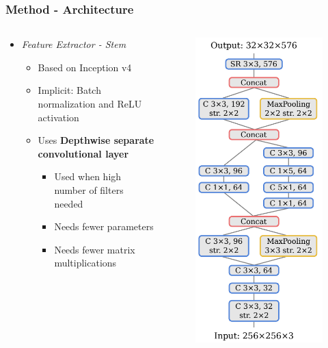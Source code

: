 \documentclass[9pt]{beamer}
\newenvironment{myframe}[1][]{%
\begin{frame}%
\frametitle{#1}
\setcounter{footnote}{0}


}{%
\end{frame}%
}
\begin{document}
\begin{myframe}[Method - Architecture]
    \begin{columns}[T]
        \begin{column}{.45\textwidth}
            \begin{itemize}
                \item \textit{Feature Extractor - Stem}
                \begin{itemize}
                    \item Based on Inception v4 \footnotemark
                    \item Implicit: Batch normalization and ReLU activation
                    \item Uses \textbf{Depthwise separate convolutional layer}\footnotemark\footnotemark
                    \begin{itemize}
                        \item Used when high number of filters needed
                        \item Needs fewer parameters
                        \item Needs fewer matrix multiplications
                    \end{itemize}
                \end{itemize}
            \end{itemize}
        \end{column}
        \begin{column}{.45\textwidth}
            \begin{figure}
                \includegraphics[width=.45\textwidth]{luvizon_stem.png}

\end{figure}
\end{column}
\end{columns}
\end{myframe}
\end{document}

